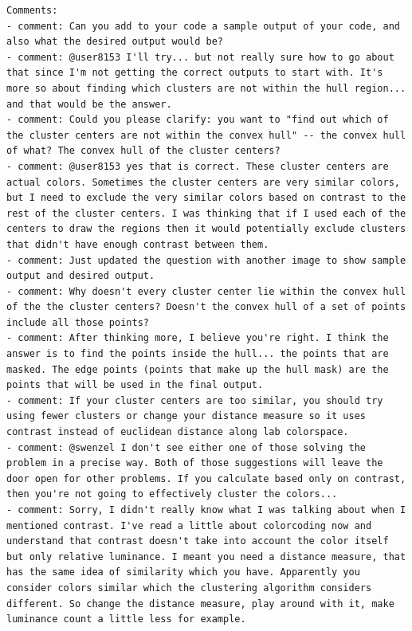 \documentclass[a4paper,oneside]{book}
\begin{document}
\begin{lstlisting}
Comments:
- comment: Can you add to your code a sample output of your code, and also what the desired output would be?
- comment: @user8153 I'll try... but not really sure how to go about that since I'm not getting the correct outputs to start with. It's more so about finding which clusters are not within the hull region... and that would be the answer.
- comment: Could you please clarify: you want to "find out which of the cluster centers are not within the convex hull" -- the convex hull of what? The convex hull of the cluster centers?
- comment: @user8153 yes that is correct. These cluster centers are actual colors. Sometimes the cluster centers are very similar colors, but I need to exclude the very similar colors based on contrast to the rest of the cluster centers. I was thinking that if I used each of the centers to draw the regions then it would potentially exclude clusters that didn't have enough contrast between them.
- comment: Just updated the question with another image to show sample output and desired output.
- comment: Why doesn't every cluster center lie within the convex hull of the the cluster centers? Doesn't the convex hull of a set of points include all those points?
- comment: After thinking more, I believe you're right. I think the answer is to find the points inside the hull... the points that are masked. The edge points (points that make up the hull mask) are the points that will be used in the final output.
- comment: If your cluster centers are too similar, you should try using fewer clusters or change your distance measure so it uses contrast instead of euclidean distance along lab colorspace.
- comment: @swenzel I don't see either one of those solving the problem in a precise way. Both of those suggestions will leave the door open for other problems. If you calculate based only on contrast, then you're not going to effectively cluster the colors...
- comment: Sorry, I didn't really know what I was talking about when I mentioned contrast. I've read a little about colorcoding now and understand that contrast doesn't take into account the color itself but only relative luminance. I meant you need a distance measure, that has the same idea of similarity which you have. Apparently you consider colors similar which the clustering algorithm considers different. So change the distance measure, play around with it, make luminance count a little less for example.
\end{lstlisting}

\newpage
\renewcommand{\bibname}{References}

\end{document}
